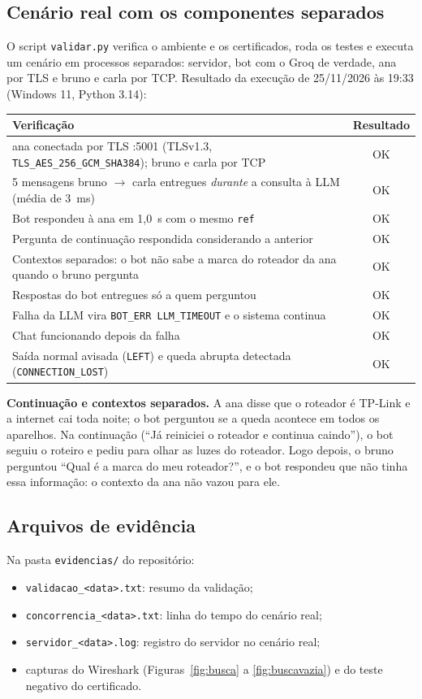 \documentclass[11pt,a4paper]{article}
\newcommand{\cod}[1]{\texttt{#1}}
\begin{document}
\subsection{Cenário real com os componentes separados}
O script \cod{validar.py} verifica o ambiente e os certificados, roda os testes e executa um cenário em
processos separados: servidor, bot com o Groq de verdade, ana por TLS e bruno e carla por TCP. Resultado
da execução de 25/11/2026 às 19:33 (Windows 11, Python 3.14):
\begin{center}
\small
\begin{tabularx}{\linewidth}{X c}
\toprule
\textbf{Verificação} & \textbf{Resultado} \\
\midrule
ana conectada por TLS :5001 (TLSv1.3, \cod{TLS\_AES\_256\_GCM\_SHA384}); bruno e carla por TCP & OK \\
5 mensagens bruno $\to$ carla entregues \emph{durante} a consulta à LLM (média de 3~ms) & OK \\
Bot respondeu à ana em 1,0~s com o mesmo \cod{ref} & OK \\
Pergunta de continuação respondida considerando a anterior & OK \\
Contextos separados: o bot não sabe a marca do roteador da ana quando o bruno pergunta & OK \\
Respostas do bot entregues só a quem perguntou & OK \\
Falha da LLM vira \cod{BOT\_ERR LLM\_TIMEOUT} e o sistema continua & OK \\
Chat funcionando depois da falha & OK \\
Saída normal avisada (\cod{LEFT}) e queda abrupta detectada (\cod{CONNECTION\_LOST}) & OK \\
\bottomrule
\end{tabularx}
\end{center}

\textbf{Continuação e contextos separados.} A ana disse que o roteador é TP-Link e a internet cai toda
noite; o bot perguntou se a queda acontece em todos os aparelhos. Na continuação (``Já reiniciei o roteador
e continua caindo''), o bot seguiu o roteiro e pediu para olhar as luzes do roteador. Logo depois, o bruno
perguntou ``Qual é a marca do meu roteador?'', e o bot respondeu que não tinha essa informação: o contexto da
ana não vazou para ele.

\subsection{Arquivos de evidência}
Na pasta \cod{evidencias/} do repositório:
\begin{itemize}
  \item \cod{validacao\_<data>.txt}: resumo da validação;
  \item \cod{concorrencia\_<data>.txt}: linha do tempo do cenário real;
  \item \cod{servidor\_<data>.log}: registro do servidor no cenário real;
  \item capturas do Wireshark (Figuras~\ref{fig:busca} a \ref{fig:buscavazia}) e do teste negativo do certificado.
\end{itemize}
\end{document}
